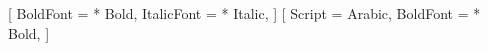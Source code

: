 \usepackage{polyglossia}
\setmainlanguage[numerals=western]{arabic}

\setmainfont{Amiri}[
  BoldFont = * Bold,
  ItalicFont = * Italic,
]
\newfontfamily{}[
  Script = Arabic,
  BoldFont = * Bold,
]
\setmonofont{DejaVu Sans Mono}

     
